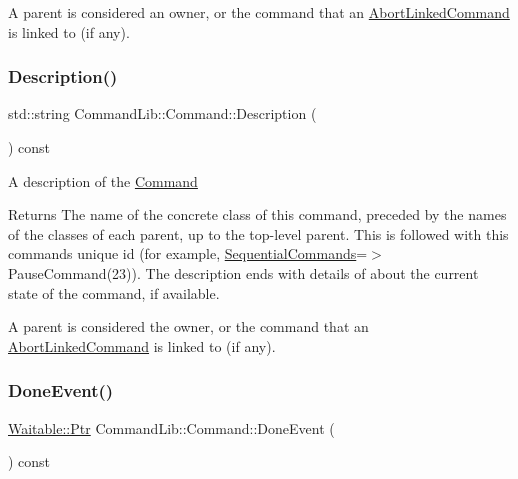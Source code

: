 A parent is considered an owner, or the command that an \mbox{\hyperlink{class_command_lib_1_1_abort_linked_command}{Abort\+Linked\+Command}} is linked to (if any).\mbox{\label{class_command_lib_1_1_command_a03783e0aea82f820805b8c4e9cc8b43e}} 
\subsubsection{\texorpdfstring{Description()}{Description()}}
{\footnotesize\ttfamily std\+::string Command\+Lib\+::\+Command\+::\+Description (\begin{DoxyParamCaption}{ }\end{DoxyParamCaption}) const}



A description of the \mbox{\hyperlink{class_command_lib_1_1_command}{Command}}

\begin{DoxyReturn}{Returns}
The name of the concrete class of this command, preceded by the names of the classes of each parent, up to the top-\/level parent. This is followed with this command\textquotesingle{}s unique id (for example, \textquotesingle{}\mbox{\hyperlink{class_command_lib_1_1_sequential_commands}{Sequential\+Commands}}=$>$Pause\+Command(23)\textquotesingle{}). The description ends with details of about the current state of the command, if available. 
\end{DoxyReturn}


A parent is considered the owner, or the command that an \mbox{\hyperlink{class_command_lib_1_1_abort_linked_command}{Abort\+Linked\+Command}} is linked to (if any). \mbox{\label{class_command_lib_1_1_command_a5f163dafd55fe63a5ed351e1543d02a3}} 
\subsubsection{\texorpdfstring{Done\+Event()}{DoneEvent()}}
{\footnotesize\ttfamily \mbox{\hyperlink{class_command_lib_1_1_waitable_ac74b6b91e48220146eada76a31cf2d9b}{Waitable\+::\+Ptr}} Command\+Lib\+::\+Command\+::\+Done\+Event (\begin{DoxyParamCaption}{ }\end{DoxyParamCaption}) const}



